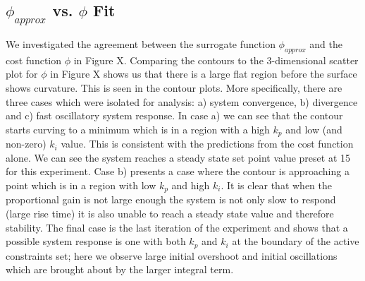 \documentclass[conference]{IEEEtran}
\theoremstyle{definition}
\begin{document}
\subsection{$\phi_{approx}$ vs. $\phi$ Fit }
We investigated the agreement between the surrogate function $\phi_{approx}$ and the cost function $\phi$ in Figure X. Comparing the contours to the 3-dimensional scatter plot for $\phi$ in Figure X shows us that there is a large flat region before the surface shows curvature. This is seen in the contour plots. More specifically, there are three cases which were isolated for analysis: a) system convergence, b) divergence and c) fast oscillatory system response. In case a) we can see that the contour starts curving to a minimum which is in a region with a high $k_p$ and low (and non-zero) $k_i$ value. This is consistent with the predictions from the cost function alone. We can see the system reaches a steady state set point value preset at 15 for this experiment. Case b) presents a case where the contour is approaching a point which is in a region with low $k_p$ and high $k_i$. It is clear that when the proportional gain is not large enough the system is not only slow to respond (large rise time) it is also unable to reach a steady state value and therefore stability. The final case is the last iteration of the experiment and shows that a possible system response is one with both $k_p$ and $k_i$ at the boundary of the active constraints set; here we observe large initial overshoot and initial oscillations which are brought about by the larger integral term. 
\end{document}
